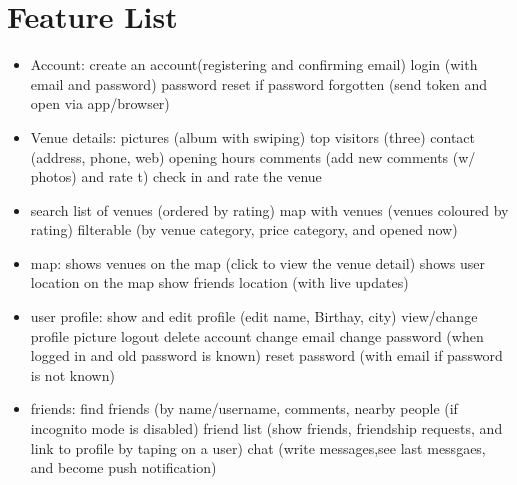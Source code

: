 \documentclass[11pt, accentcolor=tud1c]{tudreport}
\begin{document}
\chapter{Feature List}\label{ch:feature_list}
\begin{itemize}
\item Account:
\subitem create an account(registering and confirming email)
\subitem login (with email and password)
\subitem password reset if password forgotten (send token and open via app/browser)
\item Venue details:
\subitem pictures (album with swiping)
\subitem top visitors (three)
\subitem contact (address, phone, web)
\subitem opening hours
\subitem comments (add new comments (w/ photos)  and rate t) 
\subitem check in and rate the venue
\item search
\subitem list of venues (ordered by rating)
\subitem map with venues (venues coloured by rating)
\subitem filterable (by venue category, price category, and opened now)
\item map: 
\subitem shows venues on the map (click to view the venue detail)
\subitem shows user location on the map
\subitem show friends location (with live updates) 
\item user profile:
\subitem show and edit profile (edit name, Birthay, city)
\subitem view/change profile picture
\subitem logout
\subitem delete account
\subitem change email
\subitem change password (when logged in and old password is known)
\subitem reset password (with email if password is not known) 
\item friends: 
\subitem find friends (by name/username, comments, nearby people (if incognito mode is disabled)
\subitem friend list (show friends, friendship requests, and link to profile by taping on a user)
\subitem chat (write messages,see last messgaes, and become push notification)

\end{itemize}
\end{document}
